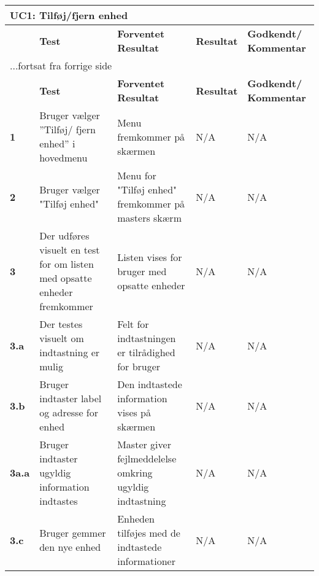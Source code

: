 \begin{center}
\begin{longtable}{|p{}|p{}|p{}|p{}|p{}|} %
\hline
\multicolumn{5}{|l|}{\textbf{UC1: Tilføj/fjern enhed}} \\ \hline
\multicolumn{1}{|c|}{} &
\textbf{Test} &
\textbf{Forventet \newline Resultat} &
\textbf{Resultat} &
\textbf{Godkendt/ \newline Kommentar} \\ \hline 
\endfirsthead

\multicolumn{5}{l}{...fortsat fra forrige side} \\ \hline 
\multicolumn{1}{|c|}{} &
\textbf{Test} &
\textbf{Forventet \newline Resultat} &
\textbf{Resultat} &
\textbf{Godkendt/ \newline Kommentar} \\ \hline 
\endhead


\textbf{1}	&Bruger vælger ''Tilføj/ fjern enhed'' i hovedmenu 
			&Menu fremkommer på skærmen 
			&N/A 
			&N/A \\\hline
			 
\textbf{2}	&Bruger vælger "Tilføj enhed" 
			&Menu for "Tilføj enhed" fremkommer på masters skærm  
			&N/A 
			&N/A \\\hline
			 
\textbf{3}	&Der udføres visuelt en test for om listen med opsatte enheder fremkommer
			&Listen vises for bruger med opsatte enheder
			&N/A 
			&N/A \\\hline
			 
\textbf{3.a}	&Der testes visuelt om indtastning er mulig
			&Felt for indtastningen er tilrådighed for bruger
			&N/A
			&N/A \\\hline 
			
\textbf{3.b}&Bruger indtaster label og adresse for enhed
			&Den indtastede information vises på skærmen 
			&N/A 
			&N/A \\\hline
			
\textbf{3a.a}&Bruger indtaster ugyldig information indtastes
			&Master giver fejlmeddelelse omkring ugyldig indtastning
			&N/A 
			&N/A \\\hline
			 
\textbf{3.c}&Bruger gemmer den nye enhed
			&Enheden tilføjes med de indtastede informationer
			&N/A 
			&N/A \\\hline
			 

\end{longtable}
\end{center}
